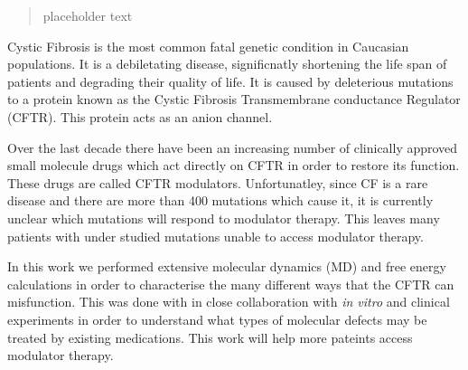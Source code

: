 \begin{abstract}
\setcounter{page}{3}
\thispagestyle{plain}

placeholder text

\end{abstract}
Cystic Fibrosis is the most common fatal genetic condition in Caucasian populations. It is a debiletating disease, significnatly shortening the life span of patients and degrading their quality of life. It is caused by deleterious mutations to a protein known as the Cystic Fibrosis Transmembrane conductance Regulator (CFTR). This protein acts as an anion channel.

Over the last decade there have been an increasing number of clinically approved small molecule drugs which act directly on CFTR in order to restore its function. These drugs are called CFTR modulators. Unfortunatley, since CF is a rare disease and there are more than 400 mutations which cause it, it is currently unclear which mutations will respond to modulator therapy. This leaves many patients with under studied mutations unable to access modulator therapy.

In this work we performed extensive molecular dynamics (MD) and free energy calculations in order to characterise the many different ways that the CFTR can misfunction. This was done with in close collaboration with \textit{in vitro} and clinical experiments in order to understand what types of molecular defects may be treated by existing medications. This work will help more pateints access modulator therapy.
